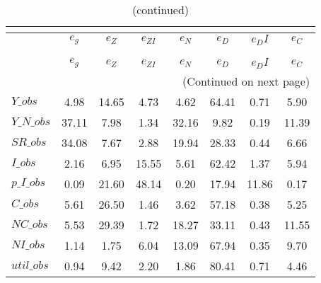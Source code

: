  
\begin{center}
\begin{longtable}{lccccccc} 
\caption{VARIANCE DECOMPOSITION (in percent)}\\
 \label{Table:th_var_decomp_uncond}\\
\toprule 
$           $	 & 	 $       {e_g}$	 & 	 $       {e_Z}$	 & 	 $    {e_{ZI}}$	 & 	 $       {e_N}$	 & 	 $       {e_D}$	 & 	 $      {e_DI}$	 & 	 $       {e_C}$\\
\midrule \endfirsthead 
\caption{(continued)}\\
 \toprule \\ 
$           $	 & 	 $       {e_g}$	 & 	 $       {e_Z}$	 & 	 $    {e_{ZI}}$	 & 	 $       {e_N}$	 & 	 $       {e_D}$	 & 	 $      {e_DI}$	 & 	 $       {e_C}$\\
\midrule \endhead 
\midrule \multicolumn{8}{r}{(Continued on next page)} \\ \bottomrule \endfoot 
\bottomrule \endlastfoot 
$Y\_obs     $	 & 	        4.98	 & 	       14.65	 & 	        4.73	 & 	        4.62	 & 	       64.41	 & 	        0.71	 & 	        5.90 \\ 
$Y\_N\_obs  $	 & 	       37.11	 & 	        7.98	 & 	        1.34	 & 	       32.16	 & 	        9.82	 & 	        0.19	 & 	       11.39 \\ 
$SR\_obs    $	 & 	       34.08	 & 	        7.67	 & 	        2.88	 & 	       19.94	 & 	       28.33	 & 	        0.44	 & 	        6.66 \\ 
$I\_obs     $	 & 	        2.16	 & 	        6.95	 & 	       15.55	 & 	        5.61	 & 	       62.42	 & 	        1.37	 & 	        5.94 \\ 
$p\_I\_obs  $	 & 	        0.09	 & 	       21.60	 & 	       48.14	 & 	        0.20	 & 	       17.94	 & 	       11.86	 & 	        0.17 \\ 
$C\_obs     $	 & 	        5.61	 & 	       26.50	 & 	        1.46	 & 	        3.62	 & 	       57.18	 & 	        0.38	 & 	        5.25 \\ 
$NC\_obs    $	 & 	        5.53	 & 	       29.39	 & 	        1.72	 & 	       18.27	 & 	       33.11	 & 	        0.43	 & 	       11.55 \\ 
$NI\_obs    $	 & 	        1.14	 & 	        1.75	 & 	        6.04	 & 	       13.09	 & 	       67.94	 & 	        0.35	 & 	        9.70 \\ 
$util\_obs  $	 & 	        0.94	 & 	        9.42	 & 	        2.20	 & 	        1.86	 & 	       80.41	 & 	        0.71	 & 	        4.46 \\ 

\end{longtable}
\end{center}
